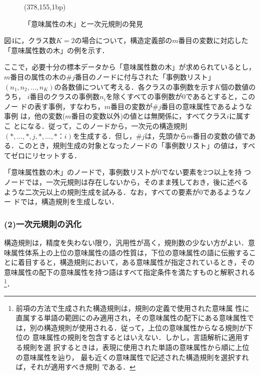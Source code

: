 \begin{figure}[thb]
\begin{center}
\begin{epsf}
\end{epsf}
\begin{draft}
\atari(378,155,1bp)
\end{draft}
\end{center}
\vspace*{-4mm}
\caption{「意味属性の木」と一次元規則の発見}
\label{fig:「意味属性の木」と一次元規則の発見}
\end{figure}

図4に，クラス数$K=2$の場合について，構造定義部の$m$番目の変数に対応した
「意味属性数の木」の例を示す．

ここで，必要十分の標本データから「意味属性数の木」が求められているとし，
$m$番目の属性の木の$\#j$番目のノードに付与された「事例数リスト」$({n_1,n_2,\dots,n_K})$の各数値について考える．各クラスの事例数を示す$K$個の数値のうち，
$i$番目のクラスの事例数${n_i}$を除くすべての事例数が0であるとすると，このノー
ドの表す事例，すなわち，$m$番目の変数が$\#j$番目の意味属性であるような事例
は，他の変数($m$番目の変数以外)の値とは無関係に，すべてクラス$i$に属すこ
とになる．従って，このノードから，一次元の構造規則$(*,\dots,*, j ,
*,\dots,*：i)$を生成する．但し，$\#j$は，先頭から$m$番目の変数の値であ
る．このとき，規則生成の対象となったノードの「事例数リスト」の値は，すべ
てゼロにリセットする．

「意味属性数の木」のノードで，事例数リストが0でない要素を2つ以上を持
つノードでは，一次元規則は存在しないから，そのまま残しておき，後に述べる
ような二次元以上の規則生成を試みる．なお，すべての要素が0であるようなノー
ドでは，構造規則を生成しない．
\subsubsection*{(2)一次元規則の汎化}
構造規則は，精度を失わない限り，汎用性が高く，規則数の少ない方がよい．意
味属性体系上の上位の意味属性の語の性質は，下位の意味属性の語に伝搬するこ
とに着目すると，構造規則において，ある意味属性が指定されているとき，その
意味属性の配下の意味属性を持つ語はすべて指定条件を満たすものと解釈される
\footnote{前項の方法で生成された構造規則は，規則の定義で使用された意味属
性に直属する単語の範囲にのみ適用され，その意味属性の配下にある意味属性で
は，別の構造規則が使用される．従って，上位の意味属性からなる規則が下位の
意味属性の規則を包含するとはいえない．しかし，言語解析に適用する規則を選
択するときは，表現に使用された単語の意味属性から順に上位の意味属性を辿り，
最も近くの意味属性で記述された構造規則を選択すれば，それが適用すべき規則
である．}．

